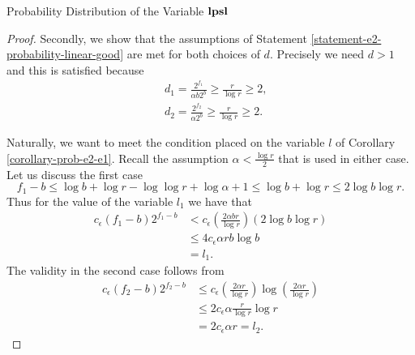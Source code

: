 \begin{section}{Probability Distribution of the Variable \texorpdfstring{$\mathbf{lpsl}$}{lpsl}}
\begin{proof}
Secondly, we show that the assumptions of Statement \ref{statement-e2-probability-linear-good} are met for both choices of $d$. Precisely we need $d > 1$ and this is satisfied because
\[
\begin{split}
& d_1 = \frac{2 ^ {f_1}}{\alpha b 2 ^ b} \geq \frac{r}{\log r} \geq 2 \text{,} \\
& d_2 = \frac{2 ^ {f_2}}{\alpha 2 ^ b} \geq \frac{r}{\log r} \geq 2 \text{.}
\end{split}
\]

Naturally, we want to meet the condition placed on the variable $l$ of Corollary \ref{corollary-prob-e2-e1}. Recall the assumption $\alpha < \frac{\log r}{2}$ that is used in either case. Let us discuss the first case
\[ 
	f_1 - b \leq \log b + \log r - \log \log r + \log \alpha + 1 \leq \log b + \log r \leq 2 \log b \log r \text{.} 
\] Thus for the value of the variable $l_1$ we have that 
\[
\begin{split}
c_{\epsilon} (f_1 - b) 2 ^ {f_1 - b}
	& < c_{\epsilon} \left(\frac{2 \alpha b r}{\log r} \right) \left(2 \log b \log r \right) \\
	& \leq 4 c_{\epsilon} \alpha r b \log b \\
	& = l_1 \text{.}
\end{split}
\]
The validity in the second case follows from
\[
\begin{split}
c_\epsilon (f_2 - b) 2 ^ {f_2 - b}
	& \leq c_\epsilon \left(\frac{2 \alpha r}{\log r}\right) \log \left( \frac{2 \alpha r}{\log r} \right) \\
	& \leq 2 c_\epsilon \alpha \frac{r}{\log r} \log r \\
	& = 2 c_\epsilon \alpha r = l_2 \text{.}
\end{split}
\]



\end{proof}
\end{section}
